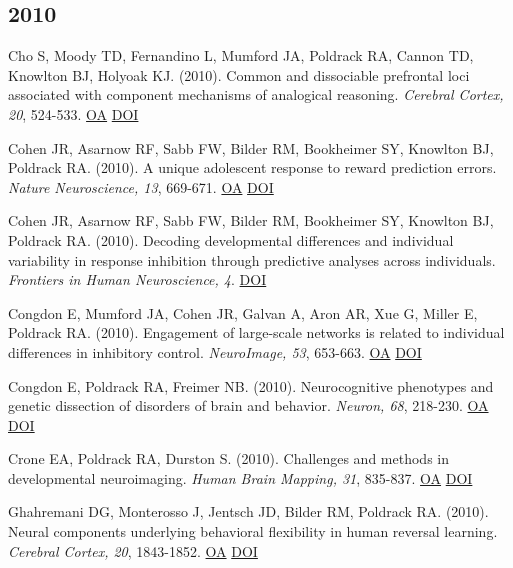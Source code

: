 \documentclass[10pt, letterpaper]{article}
\begin{document}
\subsection*{2010}Cho S, Moody TD, Fernandino L, Mumford JA, Poldrack RA, Cannon TD, Knowlton BJ, Holyoak KJ.  (2010). Common and dissociable prefrontal loci associated with component mechanisms of analogical reasoning. \textit{Cerebral Cortex, 20}, 524-533. \href{https://doi.org/10.1093/cercor/bhp121}{OA} \href{https://doi.org/10.1093/cercor/bhp121}{DOI} \vspace{2mm}

Cohen JR, Asarnow RF, Sabb FW, Bilder RM, Bookheimer SY, Knowlton BJ, Poldrack RA.  (2010). A unique adolescent response to reward prediction errors. \textit{Nature Neuroscience, 13}, 669-671. \href{https://www.ncbi.nlm.nih.gov/pmc/articles/PMC2876211}{OA} \href{https://doi.org/10.1038/nn.2558}{DOI} \vspace{2mm}

Cohen JR, Asarnow RF, Sabb FW, Bilder RM, Bookheimer SY, Knowlton BJ, Poldrack RA.  (2010). Decoding developmental differences and individual variability in response inhibition through predictive analyses across individuals. \textit{Frontiers in Human Neuroscience, 4}. \href{https://doi.org/10.3389/fnhum.2010.00047}{DOI} \vspace{2mm}

Congdon E, Mumford JA, Cohen JR, Galvan A, Aron AR, Xue G, Miller E, Poldrack RA.  (2010). Engagement of large-scale networks is related to individual differences in inhibitory control. \textit{NeuroImage, 53}, 653-663. \href{https://www.ncbi.nlm.nih.gov/pmc/articles/PMC2930099}{OA} \href{https://doi.org/10.1016/j.neuroimage.2010.06.062}{DOI} \vspace{2mm}

Congdon E, Poldrack RA, Freimer NB.  (2010). Neurocognitive phenotypes and genetic dissection of disorders of brain and behavior. \textit{Neuron, 68}, 218-230. \href{https://www.ncbi.nlm.nih.gov/pmc/articles/PMC4123421}{OA} \href{https://doi.org/10.1016/j.neuron.2010.10.007}{DOI} \vspace{2mm}

Crone EA, Poldrack RA, Durston S.  (2010). Challenges and methods in developmental neuroimaging. \textit{Human Brain Mapping, 31}, 835-837. \href{https://www.ncbi.nlm.nih.gov/pmc/articles/PMC6870689}{OA} \href{https://doi.org/10.1002/hbm.21053}{DOI} \vspace{2mm}

Ghahremani DG, Monterosso J, Jentsch JD, Bilder RM, Poldrack RA.  (2010). Neural components underlying behavioral flexibility in human reversal learning. \textit{Cerebral Cortex, 20}, 1843-1852. \href{https://www.ncbi.nlm.nih.gov/pmc/articles/PMC2901019}{OA} \href{https://doi.org/10.1093/cercor/bhp247}{DOI} \vspace{2mm}
\end{document}
